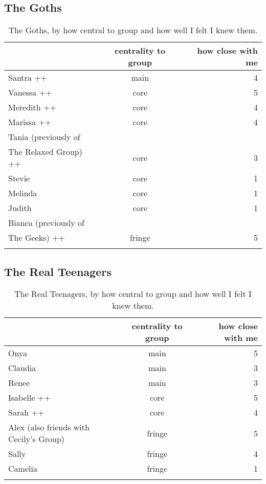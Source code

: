 \subsection{The Goths}
\nopagebreak
\begin{table}[ht]
\caption{The Goths, by how central to group and how well I felt I knew them.}\label{append:Goths}
	\centering
		\begin{tabular}{p{4cm}cr} \\
		\lsptoprule
			\multirow{2}{*}{\sc name} & \multicolumn{1}{p{2cm}}{\centering \sc centrality to group} & \multicolumn{1}{p{1.75cm}}{\centering \sc how close with me}  \\
		\midrule
Santra ++ & main & 4 \\
Vanessa ++ & core & 5 \\
Meredith ++ & core & 4 \\
Marissa ++ & core & 4 \\
Tania (previously of\\The Relaxed Group) ++ & core & 3 \\
Stevie & core & 1 \\
Melinda & core & 1 \\
Judith & core & 1 \\
Bianca (previously of\\The Geeks) ++ & fringe & 5 \\
   \lspbottomrule
	\end{tabular}
\end{table}
 
\subsection{The Real Teenagers}
\nopagebreak
\begin{table}[H]
\caption{The Real Teenagers, by how central to group and how well I felt I knew them.}\label{append:RealTeens}
	\centering
		\begin{tabular}{p{4cm}cr} \\
		\lsptoprule
			\multirow{2}{*}{\sc name} & \multicolumn{1}{p{2cm}}{\centering \sc centrality to group} & \multicolumn{1}{p{1.75cm}}{\centering \sc how close with me}  \\
		\midrule
Onya & main & 5 \\
Claudia & main & 3 \\
Renee & main & 3 \\
Isabelle ++ & core & 5 \\
Sarah ++ & core & 4 \\
Alex (also friends with Cecily's Group) & fringe & 5 \\
Sally & fringe & 4 \\
Camelia & fringe & 1 \\
   \lspbottomrule
				\end{tabular}
\end{table}


